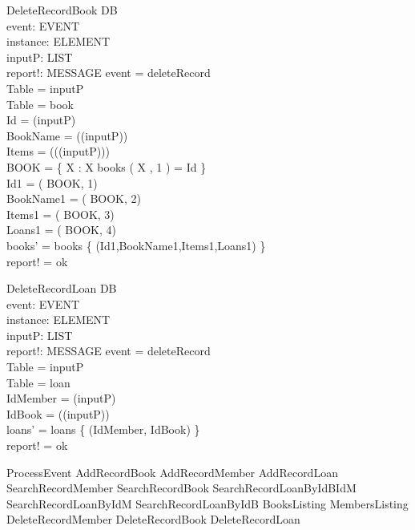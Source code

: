 \begin{schema}{DeleteRecordBook}
\Delta DB \\
event: EVENT \\
instance: ELEMENT \\
inputP: LIST \\
report!: MESSAGE
\where event = deleteRecord \\
Table = \head inputP \\
Table = book \\
Id = \head (\tail inputP) \\
BookName = \head (\tail (\tail inputP)) \\
Items = \head (\tail (\tail (\tail inputP))) \\
BOOK = \{ X : \nat \bbar X \mem books \land \nth( X , 1 ) = Id  \} \\
Id1 = \nth( \head BOOK, 1) \\
BookName1 = \nth( \head BOOK, 2) \\
Items1 = \nth( \head BOOK, 3) \\
Loans1 = \nth( \head BOOK, 4) \\
books' = books \setminus \{ (Id1,BookName1,Items1,Loans1) \} \\
report! = ok
\end{schema}

\begin{schema}{DeleteRecordLoan}
\Delta DB \\
event: EVENT \\
instance: ELEMENT \\
inputP: LIST \\
report!: MESSAGE
\where event = deleteRecord \\
Table = \head inputP \\
Table = loan \\
IdMember = \head (\tail inputP) \\
IdBook = \head (\tail (\tail inputP)) \\
loans' = loans \setminus \{ (IdMember, IdBook) \} \\
report! = ok 
\end{schema}

\begin{zed} ProcessEvent \sdef  
AddRecordBook 
\lor AddRecordMember 
\lor AddRecordLoan
\lor SearchRecordMember 
\lor SearchRecordBook 
\lor SearchRecordLoanByIdBIdM
\lor SearchRecordLoanByIdM 
\lor SearchRecordLoanByIdB 
\lor BooksListing
\lor MembersListing
\lor DeleteRecordMember 
\lor DeleteRecordBook 
\lor DeleteRecordLoan
\end{zed}

